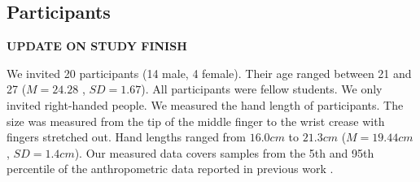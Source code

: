 \subsection{Participants}
\textbf{UPDATE ON STUDY FINISH}

We invited 20 participants (14 male, 4 female).
Their age ranged between 21 and 27 ($ M=24.28$ , $SD=1.67 $). 
All participants were fellow students. 
We only invited right-handed people.
We measured the hand length of participants. 
The size was measured from the tip of the middle finger to the wrist crease with fingers stretched out.
Hand lengths ranged from $16.0cm$ to $21.3cm$ ($M=19.44cm$ , $SD=1.4cm$).
Our measured data covers samples from the 5th and 95th percentile of the anthropometric data reported in previous work \cite{Poston}.  
